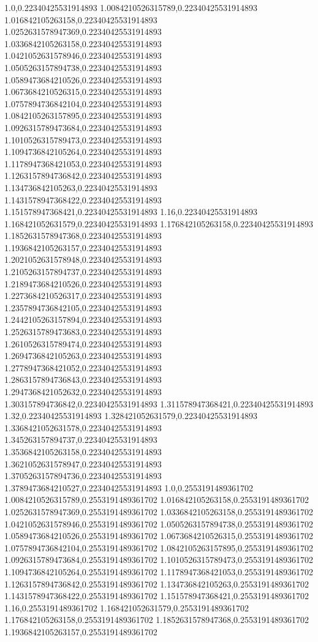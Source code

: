 1.0,0.22340425531914893
1.0084210526315789,0.22340425531914893
1.016842105263158,0.22340425531914893
1.0252631578947369,0.22340425531914893
1.0336842105263158,0.22340425531914893
1.0421052631578946,0.22340425531914893
1.0505263157894738,0.22340425531914893
1.0589473684210526,0.22340425531914893
1.0673684210526315,0.22340425531914893
1.0757894736842104,0.22340425531914893
1.0842105263157895,0.22340425531914893
1.0926315789473684,0.22340425531914893
1.1010526315789473,0.22340425531914893
1.1094736842105264,0.22340425531914893
1.1178947368421053,0.22340425531914893
1.1263157894736842,0.22340425531914893
1.134736842105263,0.22340425531914893
1.1431578947368422,0.22340425531914893
1.151578947368421,0.22340425531914893
1.16,0.22340425531914893
1.168421052631579,0.22340425531914893
1.176842105263158,0.22340425531914893
1.1852631578947368,0.22340425531914893
1.1936842105263157,0.22340425531914893
1.2021052631578948,0.22340425531914893
1.2105263157894737,0.22340425531914893
1.2189473684210526,0.22340425531914893
1.2273684210526317,0.22340425531914893
1.2357894736842105,0.22340425531914893
1.2442105263157894,0.22340425531914893
1.2526315789473683,0.22340425531914893
1.2610526315789474,0.22340425531914893
1.2694736842105263,0.22340425531914893
1.2778947368421052,0.22340425531914893
1.2863157894736843,0.22340425531914893
1.2947368421052632,0.22340425531914893
1.303157894736842,0.22340425531914893
1.311578947368421,0.22340425531914893
1.32,0.22340425531914893
1.328421052631579,0.22340425531914893
1.3368421052631578,0.22340425531914893
1.345263157894737,0.22340425531914893
1.3536842105263158,0.22340425531914893
1.3621052631578947,0.22340425531914893
1.3705263157894736,0.22340425531914893
1.3789473684210527,0.22340425531914893
1.0,0.2553191489361702
1.0084210526315789,0.2553191489361702
1.016842105263158,0.2553191489361702
1.0252631578947369,0.2553191489361702
1.0336842105263158,0.2553191489361702
1.0421052631578946,0.2553191489361702
1.0505263157894738,0.2553191489361702
1.0589473684210526,0.2553191489361702
1.0673684210526315,0.2553191489361702
1.0757894736842104,0.2553191489361702
1.0842105263157895,0.2553191489361702
1.0926315789473684,0.2553191489361702
1.1010526315789473,0.2553191489361702
1.1094736842105264,0.2553191489361702
1.1178947368421053,0.2553191489361702
1.1263157894736842,0.2553191489361702
1.134736842105263,0.2553191489361702
1.1431578947368422,0.2553191489361702
1.151578947368421,0.2553191489361702
1.16,0.2553191489361702
1.168421052631579,0.2553191489361702
1.176842105263158,0.2553191489361702
1.1852631578947368,0.2553191489361702
1.1936842105263157,0.2553191489361702
